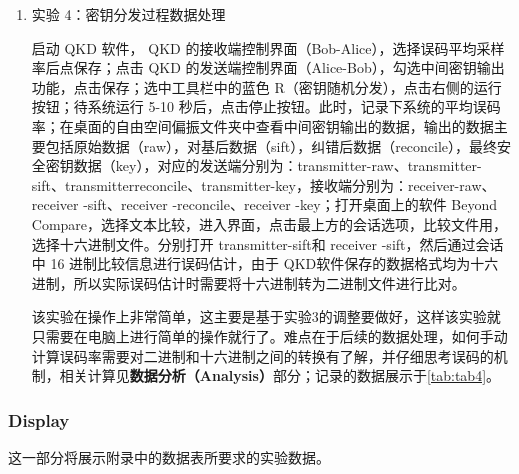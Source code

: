 \begin{enumerate}
	该实验基于实验2进一步做理论分析和实验上的调整，总得来说实验操作步骤简单（只需要调整各路的可调衰减的衰减值以及在电脑上控制各路的发送），理论计算见\textbf{数据分析（Analysis）}部分；记录的数据展示于\cref{tab:tab3}。值得注意的是虽然并不需要我们搭建实验装置，但是\textbf{关于实验装置的理解}非常有必要，能帮我们很好的理解这个实验的原理（BB84协议、密钥分发和对基等）。
	
	\item 实验 4：密钥分发过程数据处理
	
	启动 QKD 软件， QKD 的接收端控制界面（Bob-Alice），选择误码平均采样率后点保存；点击 QKD 的发送端控制界面（Alice-Bob），勾选中间密钥输出功能，点击保存；选中工具栏中的蓝色 R（密钥随机分发），点击右侧的运行按钮；待系统运行 5-10 秒后，点击停止按钮。此时，记录下系统的平均误码率；在桌面的自由空间偏振文件夹中查看中间密钥输出的数据，输出的数据主要包括原始数据（raw），对基后数据（sift），纠错后数据（reconcile），最终安全密钥数据（key），对应的发送端分别为：transmitter-raw、transmitter-sift、transmitterreconcile、transmitter-key，接收端分别为：receiver-raw、receiver -sift、receiver -reconcile、receiver -key；打开桌面上的软件 Beyond Compare，选择文本比较，进入界面，点击最上方的会话选项，比较文件用，选择十六进制文件。分别打开 transmitter-sift和 receiver -sift，然后通过会话中 16 进制比较信息进行误码估计，由于 QKD软件保存的数据格式均为十六进制，所以实际误码估计时需要将十六进制转为二进制文件进行比对。
	
	该实验在操作上非常简单，这主要是基于实验3的调整要做好，这样该实验就只需要在电脑上进行简单的操作就行了。难点在于后续的数据处理，如何手动计算误码率需要对二进制和十六进制之间的转换有了解，并仔细思考误码的机制，相关计算见\textbf{数据分析（Analysis）}部分；记录的数据展示于\cref{tab:tab4}。
\end{enumerate}	

\subsubsection{Display}
这一部分将展示附录中的数据表所要求的实验数据。

